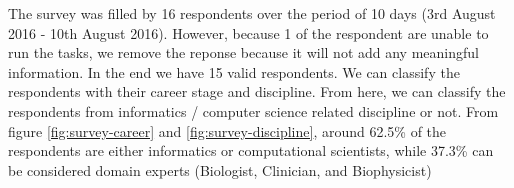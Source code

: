 \vspace{0.5cm}

\vspace{0.5cm}

\noindent%
\begin{minipage}{\linewidth}%
 \label{fig:survey-discipline}%
\end{minipage}

\vspace{0.5cm}


The survey was filled by 16 respondents over the period of 10 days (3rd August 2016 - 10th August 2016). However, because 1 of the respondent are unable to run the tasks, we remove the reponse because it will not add any meaningful information. In the end we have 15 valid respondents. We can classify the respondents with their career stage and discipline. From here, we can classify the respondents from informatics / computer science related discipline or not. From figure \ref{fig:survey-career} and \ref{fig:survey-discipline}, around 62.5\% of the respondents are either informatics or computational scientists, while 37.3\% can be considered domain experts (Biologist, Clinician, and Biophysicist)

\vspace{0.5cm}

